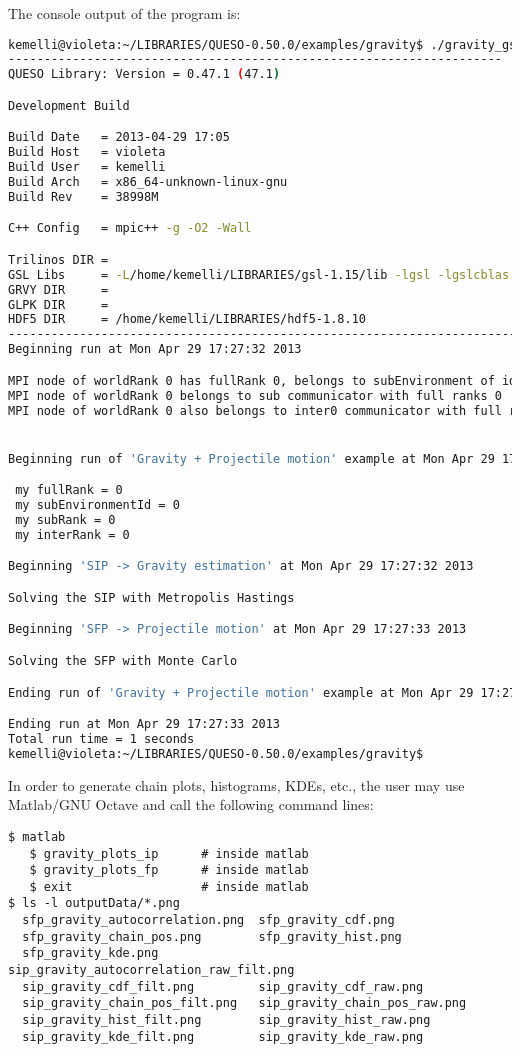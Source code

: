 The console output of the program is:
\begin{lstlisting}[caption={Console output of program \texttt{gravity\_gsl}}, label={code:console_output},language={bash}]
kemelli@violeta:~/LIBRARIES/QUESO-0.50.0/examples/gravity$ ./gravity_gsl gravity_inv_fwd.inp 
---------------------------------------------------------------------
QUESO Library: Version = 0.47.1 (47.1)

Development Build

Build Date   = 2013-04-29 17:05
Build Host   = violeta
Build User   = kemelli
Build Arch   = x86_64-unknown-linux-gnu
Build Rev    = 38998M

C++ Config   = mpic++ -g -O2 -Wall

Trilinos DIR = 
GSL Libs     = -L/home/kemelli/LIBRARIES/gsl-1.15/lib -lgsl -lgslcblas -lm
GRVY DIR     = 
GLPK DIR     = 
HDF5 DIR     = /home/kemelli/LIBRARIES/hdf5-1.8.10
--------------------------------------------------------------------------------------------------------------
Beginning run at Mon Apr 29 17:27:32 2013

MPI node of worldRank 0 has fullRank 0, belongs to subEnvironment of id 0, and has subRank 0
MPI node of worldRank 0 belongs to sub communicator with full ranks 0
MPI node of worldRank 0 also belongs to inter0 communicator with full ranks 0, and has inter0Rank 0


Beginning run of 'Gravity + Projectile motion' example at Mon Apr 29 17:27:32 2013

 my fullRank = 0
 my subEnvironmentId = 0
 my subRank = 0
 my interRank = 0

Beginning 'SIP -> Gravity estimation' at Mon Apr 29 17:27:32 2013

Solving the SIP with Metropolis Hastings

Beginning 'SFP -> Projectile motion' at Mon Apr 29 17:27:33 2013

Solving the SFP with Monte Carlo

Ending run of 'Gravity + Projectile motion' example at Mon Apr 29 17:27:33 2013

Ending run at Mon Apr 29 17:27:33 2013
Total run time = 1 seconds
kemelli@violeta:~/LIBRARIES/QUESO-0.50.0/examples/gravity$ 
\end{lstlisting}


In order to generate chain plots, histograms, KDEs, etc., the user may use Matlab/GNU Octave and call the following command lines:
\begin{lstlisting}
$ matlab
   $ gravity_plots_ip      # inside matlab
   $ gravity_plots_fp      # inside matlab
   $ exit                  # inside matlab
$ ls -l outputData/*.png
  sfp_gravity_autocorrelation.png  sfp_gravity_cdf.png
  sfp_gravity_chain_pos.png        sfp_gravity_hist.png
  sfp_gravity_kde.png              sip_gravity_autocorrelation_raw_filt.png
  sip_gravity_cdf_filt.png         sip_gravity_cdf_raw.png
  sip_gravity_chain_pos_filt.png   sip_gravity_chain_pos_raw.png
  sip_gravity_hist_filt.png        sip_gravity_hist_raw.png
  sip_gravity_kde_filt.png         sip_gravity_kde_raw.png
\end{lstlisting}

